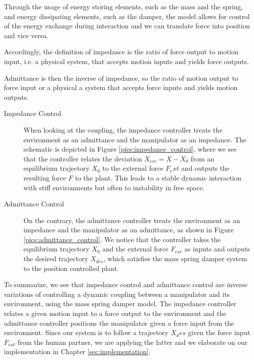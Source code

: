 Through the usage of energy storing elements, such as the mass and the spring, and energy dissipating elements, such as the damper, the model allows for control of the energy exchange during interaction and we can translate force into position and vice versa. 

Accordingly, the definition of impedance is the ratio of force output to motion input, i.e. a physical system, that accepts motion inputs and 
yields force outputs\citep{ott2010unified}.

Admittance is then the inverse of impedance, so the ratio of motion output to force input or a physical a system that accepts force inputs and yields motion outputs.

\begin{description}
\item[Impedance Control] When looking at the coupling, the impedance controller treats the environment as an admittance and the manipulator as an impedance. The schematic is depicted in Figure \ref{pics:impedance_control}, where we see that the controller relates the deviation $X_{err} = X - X_0$ from an equilibrium trajectory $X_0$ to the external force $F_ext$ and outputs the resulting force $F$ to the plant. This leads to a stable dynamic interaction with stiff environments but often to instability in free space.

\item[Admittance Control] On the contrary, the admittance controller treats the environment as an impedance and the manipulator as an admittance, as shown in Figure \ref{pics:admittance_control}. We notice that the controller takes the equilibrium trajectory $X_0$ and the external force $F_{ext}$ as inputs and outputs the desired trajectory $X_{des}$, which satisfies the mass spring damper system to the position controlled plant.
\end{description}

To summarize, we see that impedance control and admittance control are inverse variations of controlling a dynamic coupling between a manipulator and its environment, using the mass spring damper model. The impedance controller relates a given motion input to a force output to the environment and the admittance controller positions the manipulator given a force input from the environment. Since our system is to follow a trajectory $X_des$ given the force input $F_{ext}$ from the human partner, we are applying the latter and we elaborate on our implementation in Chapter \ref{sec:implementation}.

